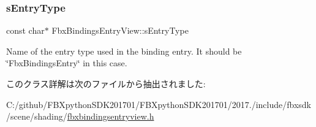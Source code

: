 \subsubsection{\texorpdfstring{s\+Entry\+Type}{sEntryType}}
{\footnotesize\ttfamily const char$\ast$ Fbx\+Bindings\+Entry\+View\+::s\+Entry\+Type\hspace{0.3cm}{\ttfamily [static]}}

Name of the entry type used in the binding entry. It should be \char`\"{}\+Fbx\+Bindings\+Entry\char`\"{} in this case. 

このクラス詳解は次のファイルから抽出されました\+:\begin{DoxyCompactItemize}
\item 
C\+:/github/\+F\+B\+Xpython\+S\+D\+K201701/\+F\+B\+Xpython\+S\+D\+K201701/2017./include/fbxsdk/scene/shading/\hyperlink{fbxbindingsentryview_8h}{fbxbindingsentryview.\+h}\end{DoxyCompactItemize}
